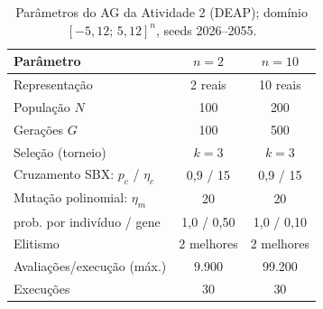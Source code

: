 \begin{table}[!t]
\centering
\footnotesize
\setlength{\tabcolsep}{4pt}
\caption{Parâmetros do AG da Atividade 2 (DEAP); domínio $[-5{,}12;\,5{,}12]^n$, seeds 2026--2055.}
\label{tab:a2_params}
\begin{tabular}{@{}lcc@{}}
\toprule
Parâmetro & $n=2$ & $n=10$ \\
\midrule
Representação & 2 reais & 10 reais \\
População $N$ & 100 & 200 \\
Gerações $G$ & 100 & 500 \\
Seleção (torneio) & $k=3$ & $k=3$ \\
Cruzamento SBX: $p_c$ / $\eta_c$ & 0{,}9 / 15 & 0{,}9 / 15 \\
Mutação polinomial: $\eta_m$ & 20 & 20 \\
\quad prob. por indivíduo / gene & 1{,}0 / 0{,}50 & 1{,}0 / 0{,}10 \\
Elitismo & 2 melhores & 2 melhores \\
Avaliações/execução (máx.) & 9.900 & 99.200 \\
Execuções & 30 & 30 \\
\bottomrule
\end{tabular}
\end{table}
